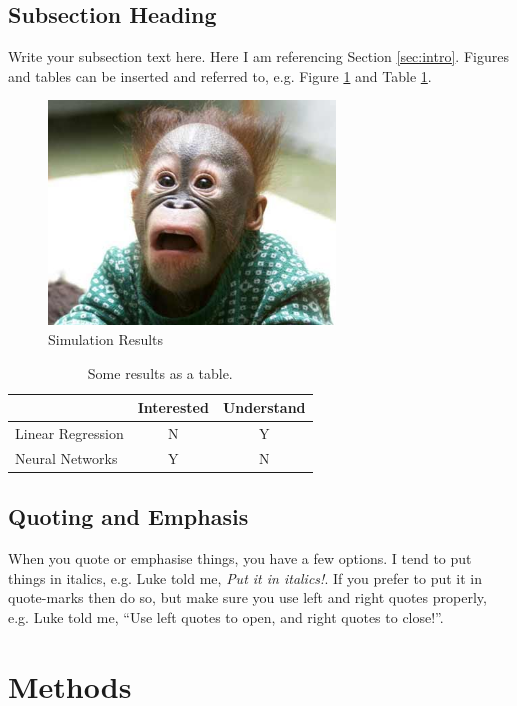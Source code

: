 \documentclass[11point]{article}
\begin{document}
\subsection{Subsection Heading}
Write your subsection text here. Here I am referencing Section \ref{sec:intro}. Figures and tables can be inserted and referred to, e.g. Figure \ref{fig:simulation_figure} and Table \ref{tbl:results_table}.

\begin{figure}
    \centering
    \includegraphics[width=3.0in]{myfigure}
    \caption{Simulation Results}
    \label{fig:simulation_figure}
\end{figure}

\begin{table}[htb]
  \centering
  \begin{tabular}{lcc}
  \toprule
  & Interested & Understand \\
  \midrule
  Linear Regression & N & Y \\
  Neural Networks & Y & N \\
  \bottomrule
  \end{tabular}
  \caption{Some results as a table.}
  \label{tbl:results_table}
\end{table}

\subsection{Quoting and Emphasis}
When you quote or emphasise things, you have a few options. I tend to put things in italics, e.g. Luke told me, \emph{Put it in italics!}. If you prefer to put it in quote-marks then do so, but make sure you use left and right quotes properly, e.g. Luke told me, ``Use left quotes to open, and right quotes to close!''.


\section{Methods}
\end{document}
